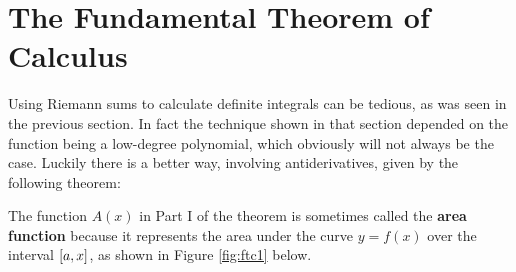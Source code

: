 \section{The Fundamental Theorem of Calculus}
Using Riemann sums to calculate definite integrals can be tedious, as was seen
in the previous section. In fact the technique shown in that section depended on
the function being a low-degree polynomial, which obviously will not always be
the case. Luckily there is a better way, involving antiderivatives, given by the
following theorem:


The function $A(x)$ in Part I of the theorem is sometimes called the
\textbf{area function} because
it represents the area under the curve $y=f(x)$ over the interval $\lbrack a,x \rbrack$,
as shown in Figure \ref{fig:ftc1} below.

